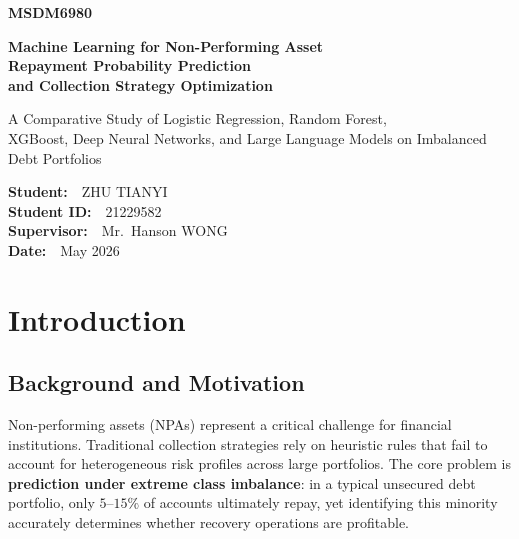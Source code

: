\documentclass[11pt, a4paper]{article}
\begin{document}
\begin{titlepage}
    \centering
    \vspace*{1.5cm}

    {\Huge \textbf{MSDM6980}\par}
    \vspace{0.8cm}
    {\Large \textbf{Machine Learning for Non-Performing Asset\\[0.3em]Repayment Probability Prediction\\[0.3em]and Collection Strategy Optimization}\par}

    \vspace{2cm}

    {\large A Comparative Study of Logistic Regression, Random Forest,\\[0.2em]XGBoost, Deep Neural Networks, and Large Language Models on Imbalanced Debt Portfolios\par}

    \vfill

    \begin{flushright}
        \textbf{Student:}~~ZHU TIANYI\\[0.3em]
        \textbf{Student ID:}~~21229582\\[0.8em]
        \textbf{Supervisor:}~~Mr.\ Hanson WONG\\[0.8em]
        \textbf{Date:}~~May 2026
    \end{flushright}

    \vspace{1cm}
\end{titlepage}


\section{Introduction}\label{sec:intro}

\subsection{Background and Motivation}

Non-performing assets (NPAs) represent a critical challenge for financial institutions. Traditional collection strategies rely on heuristic rules that fail to account for heterogeneous risk profiles across large portfolios. The core problem is \textbf{prediction under extreme class imbalance}: in a typical unsecured debt portfolio, only $5$--$15\%$ of accounts ultimately repay, yet identifying this minority accurately determines whether recovery operations are profitable.
\end{document}

